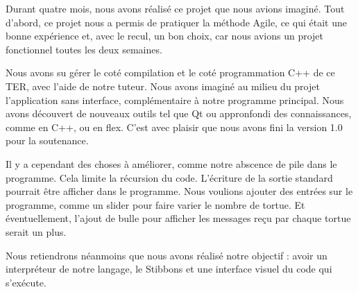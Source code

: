 Durant quatre mois, nous avons réalisé ce projet que nous avions imaginé.
Tout d'abord, ce projet nous a permis de pratiquer la méthode Agile, ce qui était une bonne expérience et, avec le recul, un bon choix, car nous avions un projet fonctionnel toutes les deux semaines.

Nous avons su gérer le coté compilation et le coté programmation C++ de ce TER, avec l'aide de notre tuteur.
Nous avons imaginé au milieu du projet l'application sans interface, complémentaire à notre programme principal.
Nous avons découvert de nouveaux outils tel que Qt ou appronfondi des connaissances, comme en C++, ou en flex.
 C'est avec plaisir que nous avons fini la version 1.0 pour la soutenance.

Il y a cependant des choses à améliorer, comme notre abscence de pile dans le programme. Cela limite la récursion du code.
L'écriture de la sortie standard pourrait être afficher dans le programme. Nous voulions ajouter des entrées sur le programme, comme un slider pour faire varier le nombre de tortue. Et éventuellement, l'ajout de bulle pour afficher les messages reçu par chaque tortue serait un plus.

Nous retiendrons néanmoins que nous avons réalisé notre objectif : avoir un interpréteur de notre langage, le Stibbons et une interface visuel du code qui s'exécute.
